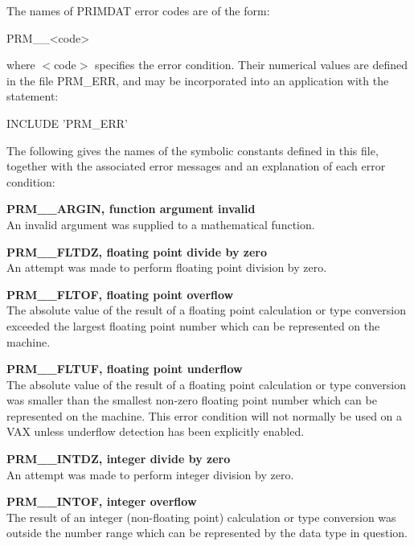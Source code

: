 \documentclass[11pt,nolof]{starlink}
\providecommand{\name}[1]{\mbox{#1}}
\begin{document}
The names of \name{PRIMDAT} error codes are of the form:

\begin{terminalv}
PRM__<code>
\end{terminalv}

where $<$code$>$ specifies the error condition.
Their numerical values are defined in the file \name{PRM\_ERR}, and may be
incorporated into an application with the statement:

\begin{terminalv}
INCLUDE 'PRM_ERR'
\end{terminalv}

The following gives the names of the symbolic constants defined in this
file, together with the associated error messages and an explanation of each
error condition:

\begin{description}

\item \textbf{PRM\_\_ARGIN, function argument invalid}\\
An invalid argument was supplied to a mathematical function.

\item \textbf{PRM\_\_FLTDZ, floating point divide by zero}\\
An attempt was made to perform floating point division by zero.

\item \textbf{PRM\_\_FLTOF, floating point overflow}\\
The absolute value of the result of a floating point calculation or type
conversion exceeded the largest floating point number which can be
represented on the machine.

\item \textbf{PRM\_\_FLTUF, floating point underflow}\\
The absolute value of the result of a floating point calculation or type
conversion was smaller than the smallest non-zero floating point number
which can be represented on the machine.
This error condition will not normally be used on a \name{VAX} unless
underflow detection has been explicitly enabled.

\item \textbf{PRM\_\_INTDZ, integer divide by zero}\\
An attempt was made to perform integer division by zero.

\item \textbf{PRM\_\_INTOF, integer overflow}\\
The result of an integer (non-floating point) calculation or type conversion
was outside the number range which can be represented by the data type in
question.


\end{description}
\end{document}
